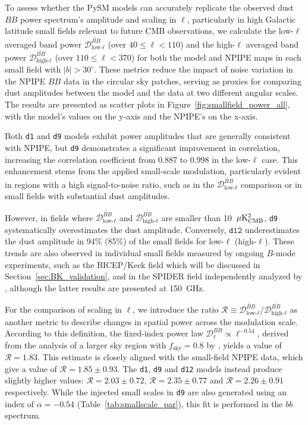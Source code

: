 \documentclass[twocolumn]{aastex631}
\begin{document}
To assess whether the PySM models can accurately replicate the observed dust $BB$ power spectrum's amplitude and scaling in $\ell$, particularly in high Galactic latitude small fields relevant to future CMB observations, we calculate the low-$\ell$ averaged band power $\overline{\mathcal{D}_{\text{low-}\ell}^{BB}}$ (over $40 \le \ell < 110$) and the high-$\ell$ averaged band power $\overline{\mathcal{D}_{\text{high-}\ell}^{BB}}$ (over $110 \le \ell < 370$) for both the model and NPIPE maps in each small field with $|b| > 30^\circ$. These metrics reduce the impact of noise variation in the NPIPE $BB$ data in the circular sky patches, serving as proxies for comparing dust amplitudes between the model and the data at two different angular scales. The results are presented as scatter plots in Figure~\ref{fig:smallfield_power_all}, with the model's values on the y-axis and the NPIPE's on the x-axis.

Both \texttt{d1} and \texttt{d9} models exhibit power amplitudes that are generally consistent with NPIPE, but \texttt{d9} demonstrates a significant improvement in correlation, increasing the correlation coefficient from 0.887 to 0.998 in the low-$\ell$ case. This enhancement stems from the applied small-scale modulation, particularly evident in regions with a high signal-to-noise ratio, such as in the $\overline{\mathcal{D}_{\text{low-}\ell}^{BB}}$ comparison or in small fields with substantial dust amplitudes. 

However, in fields where $\overline{\mathcal{D}_{\text{low-}\ell}^{BB}}$ and $\overline{\mathcal{D}_{\text{high-}\ell}^{BB}}$ are smaller than 10~$\mu\rm{K^2_{CMB}}$, \texttt{d9} systematically overestimates the dust amplitude. Conversely, $\texttt{d12}$ underestimates the dust amplitude in 94\% (85\%) of the small fields for low-$\ell$ (high-$\ell$). These trends are also observed in individual small fields measured by ongoing $B$-mode experiments, such as the BICEP/Keck field which will be discussed in Section~\ref{sec:BK_validation}, and in the SPIDER field independently analyzed by \cite{SPIDERCollaboration:2024}, although the latter results are presented at 150~GHz.

For the comparison of scaling in $\ell$, we introduce the ratio $\mathcal{R} \equiv \overline{\mathcal{D}_{\text{low-}\ell}^{BB}} \Big/ \overline{\mathcal{D}_{\text{high-}\ell}^{BB}}$ as another metric to describe changes in spatial power across the modulation scale. According to this definition, the fixed-index power law $\mathcal{D}_\ell^{BB} \propto \ell^{-0.54}$, derived from the analysis of a larger sky region with $f_\text{sky} = 0.8$ by \cite{planck2016-l11A}, yields a value of $\mathcal{R} = 1.83$. This estimate is closely aligned with the small-field NPIPE data, which give a value of $\mathcal{R} = 1.85 \pm 0.93$. The \texttt{d1}, \texttt{d9} and \texttt{d12} models instead produce slightly higher values: $\mathcal{R} = 2.03 \pm 0.72$, $\mathcal{R} = 2.35 \pm 0.77$ and $\mathcal{R} = 2.26 \pm 0.91$ respectively. While the injected small scales in \texttt{d9} are also generated using an index of $\alpha = -0.54$ (Table~\ref{tab:smallscale_par}), this fit is performed in the $bb$ spectrum. 
\end{document}
